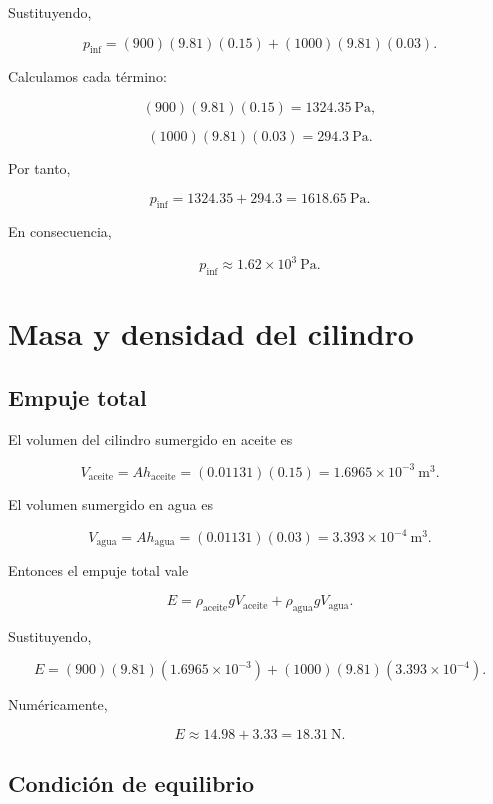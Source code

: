 \documentclass[
  letterpaper,
  DIV=11,
  numbers=noendperiod]{scrreprt}
\begin{document}
Sustituyendo,

\[
p_{\text{inf}}
=
(900)(9.81)(0.15)
+
(1000)(9.81)(0.03).
\]

Calculamos cada término:

\[
(900)(9.81)(0.15)=1324.35\ \text{Pa},
\]

\[
(1000)(9.81)(0.03)=294.3\ \text{Pa}.
\]

Por tanto,

\[
p_{\text{inf}}=1324.35+294.3=1618.65\ \text{Pa}.
\]

En consecuencia,

\[
\boxed{p_{\text{inf}}\approx 1.62\times10^3\ \text{Pa}}.
\]

\section*{Masa y densidad del
cilindro}\label{masa-y-densidad-del-cilindro}


\subsection*{Empuje total}\label{empuje-total}

El volumen del cilindro sumergido en aceite es

\[
V_{\text{aceite}}=Ah_{\text{aceite}}
=
(0.01131)(0.15)
=
1.6965\times10^{-3}\ \text{m}^3.
\]

El volumen sumergido en agua es

\[
V_{\text{agua}}=Ah_{\text{agua}}
=
(0.01131)(0.03)
=
3.393\times10^{-4}\ \text{m}^3.
\]

Entonces el empuje total vale

\[
E
=
\rho_{\text{aceite}}gV_{\text{aceite}}
+
\rho_{\text{agua}}gV_{\text{agua}}.
\]

Sustituyendo,

\[
E
=
(900)(9.81)(1.6965\times10^{-3})
+
(1000)(9.81)(3.393\times10^{-4}).
\]

Numéricamente,

\[
E\approx 14.98+3.33=18.31\ \text{N}.
\]

\subsection*{Condición de equilibrio}\label{condiciuxf3n-de-equilibrio}
\end{document}
